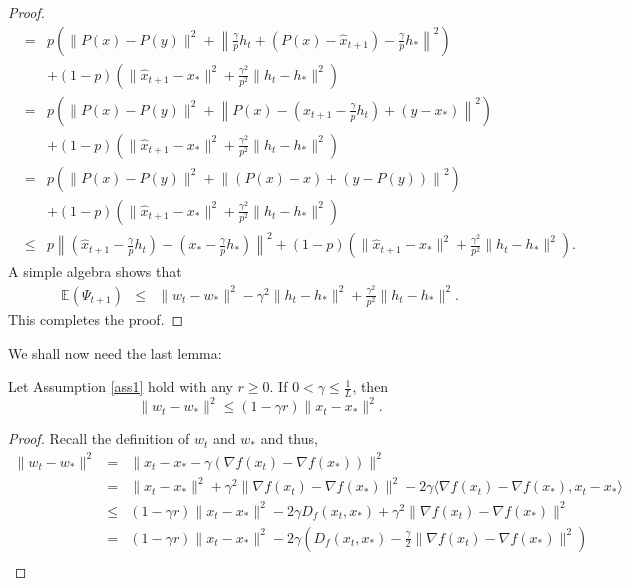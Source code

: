 \begin{itemize}
\begin{proof}
\begin{eqnarray}
&=&   p \left ( \|P(x) - P(y) \|^2 + \left \| \frac{\gamma}{p} h_t + (P(x) - \widehat{x}_{t+1})  - \frac{\gamma}{p} h_* \right \|^2 \right ) \\
&& + (1-p) \left ( \|\widehat{x}_{t+1} - x_*\|^2 + \frac{\gamma^2}{p^2} \|h_t - h_*\|^2  \right ) \\
&=& p \left ( \|P(x) - P(y) \|^2 + \left \| P(x) - (\widehat{x}_{t+1} - \frac{\gamma}{p}h_t )  + ( y - x_*) \right \|^2 \right ) \\
&& + (1-p) \left ( \|\widehat{x}_{t+1} - x_*\|^2 + \frac{\gamma^2}{p^2} \|h_t - h_*\|^2  \right ) \\
&=& p \left ( \|P(x) - P(y) \|^2 + \left \| (P(x) - x) + ( y - P(y) ) \right \|^2 \right ) \\
&& + (1-p) \left ( \|\widehat{x}_{t+1} - x_*\|^2 + \frac{\gamma^2}{p^2} \|h_t - h_*\|^2  \right ) \\
&\leq& p \left \|\left ( \widehat{x}_{t+1} - \frac{\gamma}{p} h_t \right ) - \left ( x_* - \frac{\gamma}{p} h_* \right ) \right \|^2 + (1-p) \left ( \|\widehat{x}_{t+1} - x_*\|^2 + \frac{\gamma^2}{p^2} \|h_t - h_*\|^2  \right ). 
\end{eqnarray}
A simple algebra shows that 
\begin{eqnarray}
\mathbb{E}(\Psi_{t+1}) &\leq& \|w_t - w_*\|^2 -\gamma^2\|h_t - h_*\|^2 + \frac{\gamma^2}{p^2} \|h_t - h_*\|^2. 
\end{eqnarray}
This completes the proof. 
\end{proof} 
We shall now need the last lemma: 
\begin{lemma}\label{3.4} 
Let Assumption \ref{ass1} hold with any $r \geq 0$. If $0 < \gamma \leq \frac{1}{L}$, then 
\begin{equation} 
\|w_t - w_*\|^2 \leq (1 - \gamma r) \|x_t - x_*\|^2. 
\end{equation} 
\end{lemma}
\begin{proof}
Recall the definition of $w_t$ and $w_*$ and thus, 
\begin{eqnarray}
\|w_t - w_*\|^2 &=& \|x_t - x_* - \gamma (\nabla f(x_t) - \nabla f(x_*))\|^2 \\
&=& \|x_t - x_*\|^2 + \gamma^2\|\nabla f(x_t) - \nabla f(x_*)\|^2 - 2\gamma \langle \nabla f(x_t) - \nabla f(x_*), x_t - x_* \rangle \\ 
&\leq& (1 - \gamma r) \|x_t - x_*\|^2  - 2\gamma D_f(x_t,x_*) + \gamma^2 \|\nabla f(x_t) - \nabla f(x_*)\|^2 \\ 
&=& (1 - \gamma r) \|x_t - x_*\|^2  - 2\gamma \left ( D_f(x_t,x_*) - \frac{\gamma}{2} \|\nabla f(x_t) - \nabla f(x_*)\|^2 \right ) \\ 

\end{eqnarray}
\end{proof}
\end{itemize}
